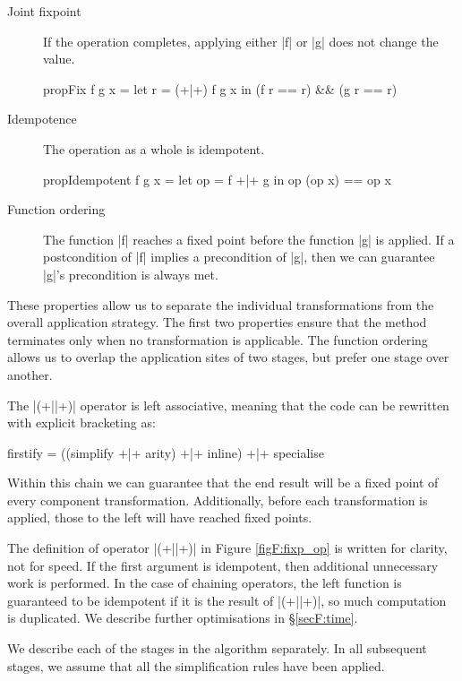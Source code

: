 \begin{description}
\item[Joint fixpoint] If the operation completes, applying either |f| or |g| does not change the value.

\begin{code}
propFix f g x = let r = (+|+) f g x in (f r == r) && (g r == r)
\end{code}

\item[Idempotence] The operation as a whole is idempotent.

\begin{code}
propIdempotent f g x = let op = f +|+ g in op (op x) == op x
\end{code}

\item[Function ordering] The function |f| reaches a fixed point before the function |g| is applied. If a postcondition of |f| implies a precondition of |g|, then we can guarantee |g|'s precondition is always met.
\end{description}

These properties allow us to separate the individual transformations from the overall application strategy. The first two properties ensure that the method terminates only when no transformation is applicable. The function ordering allows us to overlap the application sites of two stages, but prefer one stage over another.

The |(+||+)| operator is left associative, meaning that the code can be rewritten with explicit bracketing as:

\begin{code}
firstify = ((simplify +|+ arity) +|+ inline) +|+ specialise
\end{code}

Within this chain we can guarantee that the end result will be a fixed point of every component transformation. Additionally, before each transformation is applied, those to the left will have reached fixed points.

The definition of operator |(+||+)| in Figure \ref{figF:fixp_op} is written for clarity, not for speed. If the first argument is idempotent, then additional unnecessary work is performed. In the case of chaining operators, the left function is guaranteed to be idempotent if it is the result of |(+||+)|, so much computation is duplicated. We describe further optimisations in \S\ref{secF:time}.

We describe each of the stages in the algorithm separately. In all subsequent stages, we assume that all the simplification rules have been applied.


